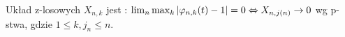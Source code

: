 Układ z-losowych $X_{n,k}$ jest : $\lim_n \max_k |\varphi_{n,k}(t) - 1| = 0 \Leftrightarrow X_{n,j(n)} \to 0$ wg p-stwa, gdzie $1 \le k, j_n \le n$.